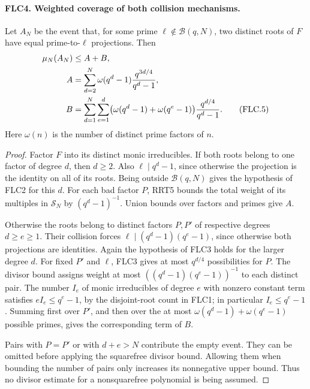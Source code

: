 \documentclass[11pt,a4paper]{article}
\numberwithin{equation}{section}
\theoremstyle{remark}\newtheorem{remark}[theorem]{Remark}
\begin{document}
\paragraph{FLC4. Weighted coverage of both collision mechanisms.}
\label{claim:FLC4}
Let $A_N$ be the event that, for some prime
$\ell\notin\mathcal B(q,N)$, two distinct roots of $F$ have equal
prime-to-$\ell$ projections.  Then
\begin{align}
 \mu_N(A_N)&\le A+B,\notag\\
 A&=\sum_{d=2}^{N}\omega(q^d-1)
                \frac{q^{3d/4}}{q^d-1},\notag\\
 B&=\sum_{d=1}^{N}\sum_{e=1}^{d}
       \bigl(\omega(q^d-1)+\omega(q^e-1)\bigr)
                \frac{q^{d/4}}{q^d-1}.
 \tag{FLC.5}
\end{align}
Here $\omega(n)$ is the number of distinct prime factors of $n$.
\begin{proof}
Factor $F$ into its distinct monic irreducibles.  If both roots
belong to one factor of degree $d$, then $d\ge2$.  Also
$\ell\mid q^d-1$, since otherwise the projection is the identity
on all of its roots.  Being outside $\mathcal B(q,N)$ gives
the hypothesis of FLC2 for this $d$.  For each bad factor $P$,
RRT5 bounds the total weight of its multiples in $\mathcal S_N$
by $(q^d-1)^{-1}$.  Union bounds over factors and primes give $A$.

Otherwise the roots belong to distinct factors $P,P'$ of
respective degrees $d\ge e\ge1$.  Their collision forces
$\ell\mid(q^d-1)(q^e-1)$, since otherwise both projections are
identities.  Again the hypothesis of FLC3 holds for the larger
degree $d$.  For fixed $P'$ and $\ell$, FLC3 gives at most
$q^{d/4}$ possibilities for $P$.  The divisor bound assigns
weight at most $((q^d-1)(q^e-1))^{-1}$ to each distinct pair.
The number $I_e$ of monic irreducibles of degree $e$ with
nonzero constant term satisfies
$eI_e\le q^e-1$, by the disjoint-root count in FLC1; in
particular $I_e\le q^e-1$.  Summing first over $P'$, and then
over the at most $\omega(q^d-1)+\omega(q^e-1)$ possible primes,
gives the corresponding term of $B$.

Pairs with $P=P'$ or with $d+e>N$ contribute the empty event.
They can be omitted before applying the squarefree divisor bound.
Allowing them when bounding the number of pairs only increases
its nonnegative upper bound.  Thus no divisor estimate for a
nonsquarefree polynomial is being assumed.
\end{proof}

\end{document}
